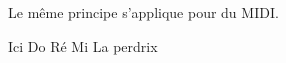 \documentclass[preview]{standalone}
\begin{document}
\begin{center}
Le même principe s'applique pour du MIDI.
    
    Ici Do Ré Mi La perdrix
\end{center}
\end{document}
